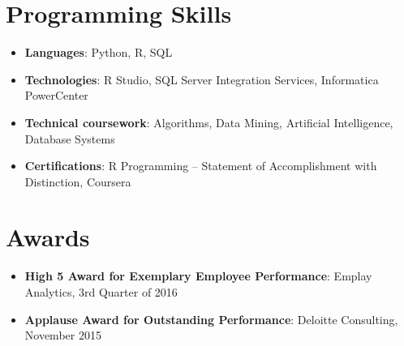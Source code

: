 \documentclass[letterpaper,11pt]{article}
\newcommand{\resumeSubHeadingListStart}{\begin{itemize}[leftmargin=*]}
\newcommand{\resumeSubHeadingListEnd}{\end{itemize}}
\begin{document}
\section{Programming Skills}
  \resumeSubHeadingListStart
    \item{\textbf{Languages}{: Python, R, SQL}}
    \item{\textbf{Technologies}{: R Studio, SQL Server Integration Services, Informatica PowerCenter}}
    \item{\textbf{Technical coursework}{: Algorithms, Data Mining, Artificial Intelligence, Database Systems}}
    \item{\textbf{Certifications}{: R Programming – Statement of Accomplishment with Distinction, Coursera}}


  \resumeSubHeadingListEnd


\section{Awards}
  \resumeSubHeadingListStart
    \item{\textbf{High 5 Award for Exemplary Employee Performance}{: Emplay Analytics, 3rd Quarter of 2016}}
    \item{\textbf{Applause Award for Outstanding Performance}{: Deloitte Consulting, November 2015}}

  \resumeSubHeadingListEnd


\end{document}
